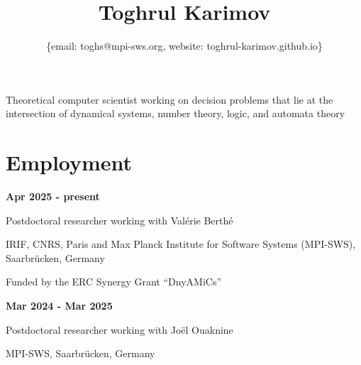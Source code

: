 \documentclass{article}
\title{\bfseries\Huge Toghrul Karimov}
\author{\{email: toghs@mpi-sws.org, website: toghrul-karimov.github.io\}}
\date{}
\begin{document}
	\maketitle
	
	Theoretical computer scientist working on decision problems that lie at the intersection of dynamical systems, number theory, logic, and automata theory
	
	\section*{Employment}
	\begin{minipage}{0.3\textwidth}
		\hspace{0.1cm} \textbf{Apr 2025 - present}
	\end{minipage}
	\vspace*{0.25cm}
	\begin{minipage}{0.7\textwidth}
		Postdoctoral researcher working with Val\'erie Berth\'e 
		
		\vspace*{0.2cm}
		
		IRIF, CNRS, Paris and Max Planck Institute for Software Systems (MPI-SWS), Saarbr\"ucken, Germany
		
		\vspace*{0.2cm}
		
		Funded by the ERC Synergy Grant ``DnyAMiCs''
		\vspace{0.3cm}
	\end{minipage}
	\vspace{0.85cm}
	\begin{minipage}{0.3\textwidth}
		\hspace{0.1cm} \textbf{Mar 2024 - Mar 2025}
	\end{minipage}
	\begin{minipage}{0.7\textwidth}
		Postdoctoral researcher working with Jo\"el Ouaknine
		
		\vspace*{0.2cm}
		MPI-SWS, Saarbr\"ucken, Germany
	\end{minipage}
		
\end{document}
